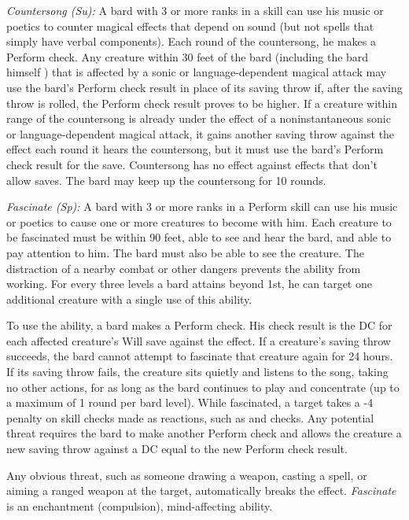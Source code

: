 \textit{Countersong (Su):} A bard with 3 or more ranks in a  skill can use 
his music or poetics to counter magical effects that depend on sound (but not spells 
that simply have verbal components). Each round of the countersong, he makes a 
Perform check. Any creature within 30 feet of the bard (including the bard himself 
) that is affected by a sonic or language-dependent magical attack may use the 
bard's Perform check result in place of its saving throw if, after the saving throw 
is rolled, the Perform check result proves to be higher. If a creature within range 
of the countersong is already under the effect of a noninstantaneous sonic or language-dependent 
magical attack, it gains another saving throw against the effect each round it 
hears the countersong, but it must use the bard's Perform check result for the 
save. Countersong has no effect against effects that don't allow saves. The bard 
may keep up the countersong for 10 rounds.

\textit{Fascinate (Sp):} A bard with 3 or more ranks in a Perform skill can use 
his music or poetics to cause one or more creatures to become  with him. 
Each creature to be fascinated must be within 90 feet, able to see and hear the 
bard, and able to pay attention to him. The bard must also be able to see the creature. 
The distraction of a nearby combat or other dangers prevents the ability from working. 
For every three levels a bard attains beyond 1st, he can target one additional 
creature with a single use of this ability.

To use the ability, a bard makes a Perform check. His check result is the DC for 
each affected creature's Will save against the effect. If a creature's saving throw 
succeeds, the bard cannot attempt to fascinate that creature again for 24 hours. 
If its saving throw fails, the creature sits quietly and listens to the song, taking 
no other actions, for as long as the bard continues to play and concentrate (up 
to a maximum of 1 round per bard level). While fascinated, a target takes a -4 
penalty on skill checks made as reactions, such as  and  checks. Any 
potential threat requires the bard to make another Perform check and allows the 
creature a new saving throw against a DC equal to the new Perform check result.

Any obvious threat, such as someone drawing a weapon, casting a spell, or aiming 
a ranged weapon at the target, automatically breaks the effect. \textit{Fascinate}
is an enchantment (compulsion), mind-affecting ability.

